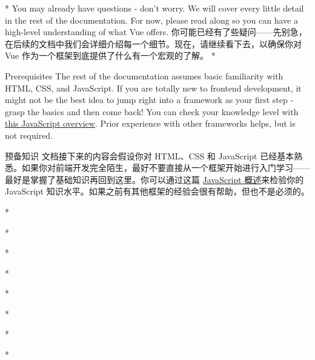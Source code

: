 \begin{paracol}{2}
\switchcolumn[0]*%
You may already have questions - don't worry. We will cover every little
detail in the rest of the documentation. For now, please read along so
you can have a high-level understanding of what Vue offers.
\switchcolumn
你可能已经有了些疑问------先别急，在后续的文档中我们会详细介绍每一个细节。现在，请继续看下去，以确保你对
Vue 作为一个框架到底提供了什么有一个宏观的了解。
\switchcolumn[0]*%
\begin{vueQuote}
{Prerequisites}
The rest of the documentation assumes basic familiarity with HTML, CSS,
and JavaScript. If you are totally new to frontend development, it might
not be the best idea to jump right into a framework as your first step -
grasp the basics and then come back! You can check your knowledge level
with
\href{https://developer.mozilla.org/en-US/docs/Web/JavaScript/A_re-introduction_to_JavaScript}{this
JavaScript overview}. Prior experience with other frameworks helps, but
is not required.
\end{vueQuote}
\switchcolumn

\begin{vueQuote}{预备知识}
文档接下来的内容会假设你对 HTML、CSS 和 JavaScript
已经基本熟悉。如果你对前端开发完全陌生，最好不要直接从一个框架开始进行入门学习------最好是掌握了基础知识再回到这里。你可以通过这篇
\href{https://developer.mozilla.org/zh-CN/docs/Web/JavaScript/A_re-introduction_to_JavaScript}{JavaScript
概述}来检验你的 JavaScript
知识水平。如果之前有其他框架的经验会很有帮助，但也不是必须的。
\end{vueQuote}
\switchcolumn[0]*%

\switchcolumn

\switchcolumn[0]*%

\switchcolumn

\switchcolumn[0]*%

\switchcolumn

\switchcolumn[0]*%

\switchcolumn

\switchcolumn[0]*%

\switchcolumn

\switchcolumn[0]*%

\switchcolumn

\switchcolumn[0]*%

\switchcolumn

\switchcolumn[0]*%

\switchcolumn


\end{paracol}
